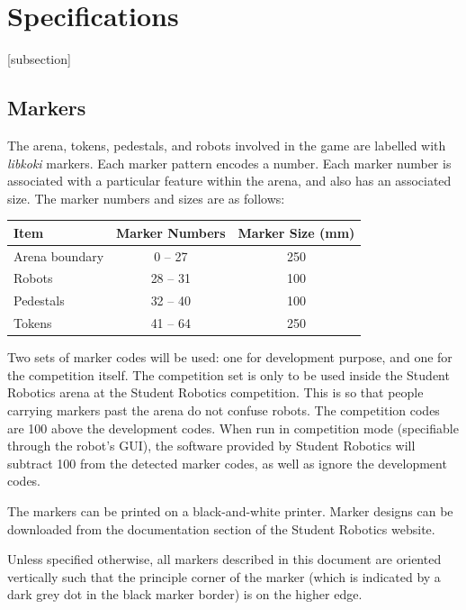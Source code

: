 \section{Specifications}
\label{sec:Specifications}

[subsection]
\newcommand{\rcnii}{\stepcounter{rulei}\arabic{section}.\arabic{subsection}.\arabic{rulei}}
\renewcommand{\labelenumi}{\rcnii}

\subsection{Markers}
\label{sub:markers}
The arena, tokens, pedestals, and robots involved in the game are labelled with \textit{libkoki} markers.
Each marker pattern encodes a number.
Each marker number is associated with a particular feature within the arena, and also has an associated size.
The marker numbers and sizes are as follows:

\begin{center}
  \begin{tabular}{lcc}
    \toprule
    \textbf{Item} & \textbf{Marker Numbers} & \textbf{Marker Size (mm)} \\
    \midrule
    Arena boundary & 0 -- 27 & 250 \\
    Robots & 28 -- 31 & 100 \\
    Pedestals & 32 -- 40 & 100 \\
    Tokens & 41 -- 64 & 250 \\
    \bottomrule
  \end{tabular}
\end{center}

Two sets of marker codes will be used: one for development purpose, and one for the competition itself.
The competition set is only to be used inside the Student Robotics arena at the Student Robotics competition.
This is so that people carrying markers past the arena do not confuse robots.
The competition codes are 100 above the development codes.
When run in competition mode (specifiable through the robot's GUI), the software provided by Student Robotics will subtract 100 from the detected marker codes, as well as ignore the development codes.

The markers can be printed on a black-and-white printer.
Marker designs can be downloaded from the documentation section of the Student Robotics website.

Unless specified otherwise, all markers described in this document are oriented vertically such that the principle corner of the marker (which is indicated by a dark grey dot in the black marker border) is on the higher edge.

